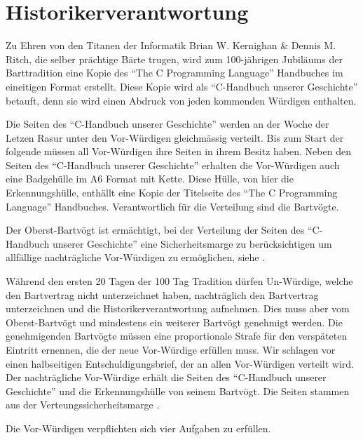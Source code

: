 \documentclass[fontsize=12pt,parskip=half]{scrartcl}
\begin{document}
\pagebreak
\section{Historikerverantwortung}
\begin{contract}

  \Clause[title={``C-Handbuch unserer Geschichte''}]
  Zu Ehren von den Titanen der Informatik Brian W. Kernighan \& Dennis M. Ritch, die selber prächtige Bärte trugen,
  wird zum 100-jährigen Jubiläums der Barttradition eine Kopie des ``The C Programming Language'' Handbuches im
  eineitigen Format erstellt. Diese Kopie wird als ``C-Handbuch unserer Geschichte'' betauft, denn sie wird einen
  Abdruck von jeden kommenden Würdigen enthalten.

  \Clause[title={Verteilung}]
  Die Seiten des ``C-Handbuch unserer Geschichte'' werden an der Woche der Letzen Rasur unter den Vor-Würdigen gleichmässig verteilt.
  Bis zum Start der folgende müssen all Vor-Würdigen ihre Seiten in ihrem Besitz haben. Neben den Seiten des ``C-Handbuch unserer Geschichte''
  erhalten die Vor-Würdigen auch eine Badgehülle im A6 Format mit Kette. Diese Hülle, von hier die Erkennungshülle, enthällt eine Kopie der
  Titelseite des ``The C Programming Language'' Handbuches. Verantwortlich für die Verteilung sind die Bartvögte.

  \SubClause[title={Verteilungssicherheitsmarge}]\label{H.verteilungsmarge}
  Der Oberst-Bartvögt ist ermächtigt, bei der Verteilung der Seiten des ``C-Handbuch unserer Geschichte'' eine Sicherheitsmarge zu berücksichtigen um allfällige nachträgliche Vor-Würdigen
  zu ermöglichen, siehe .

  \Clause[title={Nachträgliche Vor-Würdige}]\label{H.nachzug}
  Während den ersten 20 Tagen der 100 Tag Tradition dürfen Un-Würdige, welche den Bartvertrag nicht unterzeichnet haben, nachträglich den Bartvertrag unterzeichnen und die Historikerverantwortung
  aufnehmen. Dies muss aber vom Oberst-Bartvögt und mindestens ein weiterer Bartvögt genehmigt werden. Die genehmigenden Bartvögte müssen eine proportionale Strafe für den verspäteten Eintritt ernennen,
  die der neue Vor-Würdige erfüllen muss. Wir schlagen vor einen halbseitigen Entschuldigungsbrief, der an allen Vor-Würdigen verteilt wird. Der nachträgliche Vor-Würdige erhält die Seiten des ``C-Handbuch unserer Geschichte''
  und die Erkennungshülle von seinem Bartvögt. Die Seiten stammen aus der Verteungssicherheitsmarge .

  \Clause[title={Erkennungs-, Schutz-, Vorweis-, Wissensaufgabe}] \label{H.aufgaben}
  Die Vor-Würdigen verpflichten sich vier Aufgaben zu erfüllen.


\end{contract}
\end{document}
